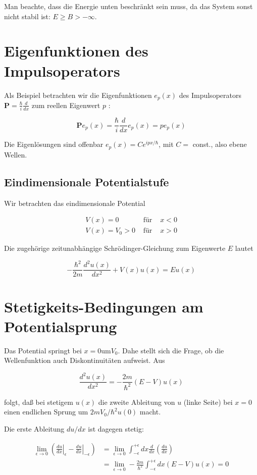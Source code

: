 \documentclass[10pt, letterpaper]{article}
\begin{document}
Man beachte, dass die Energie unten beschränkt sein muss, da das System sonst nicht stabil ist: $E \geq B>-\infty$.

\section*{Eigenfunktionen des Impulsoperators}
Als Beispiel betrachten wir die Eigenfunktionen $e_{p}(x)$ des Impulsoperators $\mathbf{P}=\frac{\hbar}{i} \frac{d}{d x}$ zum reellen Eigenwert $p$ :

$$
\mathbf{P} e_{p}(x)=\frac{\hbar}{i} \frac{d}{d x} e_{p}(x)=p e_{p}(x)
$$

Die Eigenlösungen sind offenbar $e_{p}(x)=C e^{i p x / \hbar}$, mit $C=$ const., also ebene Wellen.

\subsection*{Eindimensionale Potentialstufe}
Wir betrachten das eindimensionale Potential

$$
\begin{array}{rlll}
V(x)=0 & \text { für } & x<0 \\
V(x)=V_{0}>0 & \text { für } & x>0
\end{array}
$$

Die zugehörige zeitunabhängige Schrödinger-Gleichung zum Eigenwerte $E$ lautet

$$
-\frac{\hbar^{2}}{2 m} \frac{d^{2} u(x)}{d x^{2}}+V(x) u(x)=E u(x)
$$

\section*{Stetigkeits-Bedingungen am Potentialsprung}
Das Potential springt bei $x=0 \mathrm{um} V_{0}$. Dahe stellt sich die Frage, ob die Wellenfunktion auch Diskontinuitäten aufweist. Aus

$$
\frac{d^{2} u(x)}{d x^{2}}=-\frac{2 m}{\hbar^{2}}(E-V) u(x)
$$

folgt, daß bei stetigem $u(x)$ die zweite Ableitung von $u$ (linke Seite) bei $x=0$ einen endlichen Sprung um $2 m V_{0} / \hbar^{2} u(0)$ macht.

Die erste Ableitung $d u / d x$ ist dagegen stetig:

$$
\begin{aligned}
\lim _{\epsilon \rightarrow 0}\left(\left.\frac{d u}{d x}\right|_{\epsilon}-\left.\frac{d u}{d x}\right|_{-\epsilon}\right) & =\lim _{\epsilon \rightarrow 0} \int_{-\epsilon}^{+\epsilon} d x \frac{d}{d x}\left(\frac{d u}{d x}\right) \\
& =\lim _{\epsilon \rightarrow 0}-\frac{2 m}{\hbar^{2}} \int_{-\epsilon}^{+\epsilon} d x(E-V) u(x)=0
\end{aligned}
$$
\end{document}
